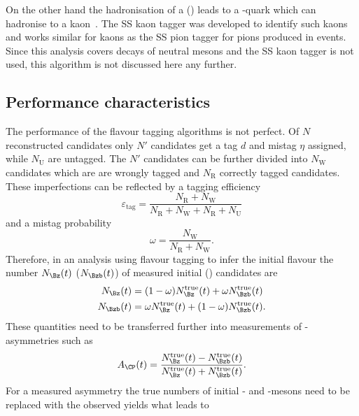 On the other hand the hadronisation of a \Bs (\bquarkbar\squark) leads to a \squarkbar-quark which can hadronise to a kaon~\cite{Aaij:2016psi}.
The SS kaon tagger was developed to identify such kaons and works similar for kaons as the SS pion tagger for pions produced in \Bz events.
Since this analysis covers decays of neutral \Bz mesons and the SS kaon tagger is not used, this algorithm is not discussed here any further.

\subsection{Performance characteristics}

The performance of the flavour tagging algorithms is not perfect.
Of $N$ reconstructed candidates only $N'$ candidates get a tag $d$ and mistag $\eta$ assigned, while $N_{\text{U}}$ are untagged.
The $N'$ candidates can be further divided into $N_{\text{W}}$ candidates which are are wrongly tagged and $N_{\text{R}}$ correctly tagged candidates.
These imperfections can be reflected by a tagging efficiency
\begin{equation}
\varepsilon_{\text{tag}}=\frac{N_{\text{R}}+N_{\text{W}}}{N_{\text{R}}+N_{\text{W}}+N_{\text{R}}+N_{\text{U}}}\label{eq:tageff}
\end{equation}
and a mistag probability
\begin{equation}
\omega=\frac{N_{\text{W}}}{N_{\text{R}}+N_{\text{W}}}.\label{eq:mistag}
\end{equation}
Therefore, in an analysis using flavour tagging to infer the initial \B flavour the number $N_{\Bz}(t)$ ($N_{\Bzb}(t)$) of measured initial \Bz (\Bzb) candidates are
\begin{equation}
\begin{aligned}
N_{\Bz}(t)&=(1-\omega)N_{\Bz}^{\text{true}}(t)+\omega N_{\Bzb}^{\text{true}}(t)\\
N_{\Bzb}(t)&=\omega N_{\Bz}^{\text{true}}(t)+(1-\omega)N_{\Bzb}^{\text{true}}(t).
\end{aligned}
\end{equation}
These quantities need to be transferred further into measurements of \CP-asymmetries such as
\begin{equation}
A_{\CP}(t)=\frac{N_{\Bz}^{\text{true}}(t)-N_{\Bzb}^{\text{true}}(t)}{N_{\Bz}^{\text{true}}(t)+N_{\Bzb}^{\text{true}}(t)}.
\end{equation}
For a measured asymmetry the true numbers of initial \Bz- and \Bzb-mesons need to be replaced with the observed yields what leads to
